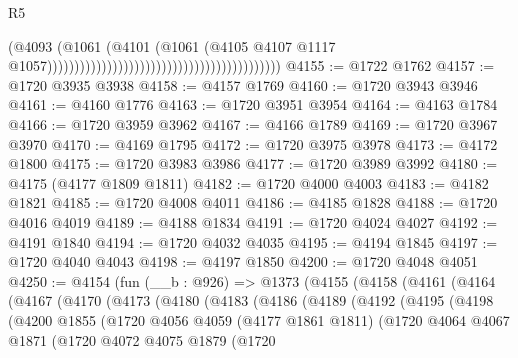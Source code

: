 \begin{lexlean}{R5}
\begin{coremodule}
                                                                                (@4093
                                                                                  (@1061
                                                                                    (@4101
                                                                                      (@1061
                                                                                        (@4105
                                                                                          @4107
                                                                                          @1117
                                                                                          @1057)))))))))))))))))))))))))))))))))))))))))))
@4155 := @1722 @1762
@4157 := @1720 @3935 @3938
@4158 := @4157 @1769
@4160 := @1720 @3943 @3946
@4161 := @4160 @1776
@4163 := @1720 @3951 @3954
@4164 := @4163 @1784
@4166 := @1720 @3959 @3962
@4167 := @4166 @1789
@4169 := @1720 @3967 @3970
@4170 := @4169 @1795
@4172 := @1720 @3975 @3978
@4173 := @4172 @1800
@4175 := @1720 @3983 @3986
@4177 := @1720 @3989 @3992
@4180 := @4175 (@4177 @1809 @1811)
@4182 := @1720 @4000 @4003
@4183 := @4182 @1821
@4185 := @1720 @4008 @4011
@4186 := @4185 @1828
@4188 := @1720 @4016 @4019
@4189 := @4188 @1834
@4191 := @1720 @4024 @4027
@4192 := @4191 @1840
@4194 := @1720 @4032 @4035
@4195 := @4194 @1845
@4197 := @1720 @4040 @4043
@4198 := @4197 @1850
@4200 := @1720 @4048 @4051
@4250 := @4154
    (fun (__b : @926) =>
    @1373
      (@4155
        (@4158
          (@4161
            (@4164
              (@4167
                (@4170
                  (@4173
                    (@4180
                      (@4183
                        (@4186
                          (@4189
                            (@4192
                              (@4195
                                (@4198
                                  (@4200
                                    @1855
                                    (@1720
                                      @4056
                                      @4059
                                      (@4177 @1861 @1811)
                                      (@1720
                                        @4064
                                        @4067
                                        @1871
                                        (@1720
                                          @4072
                                          @4075
                                          @1879
                                          (@1720

\end{coremodule}
\end{lexlean}
